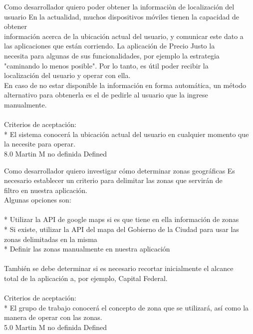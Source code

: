 \vspace{20pt}

	{Como desarrollador quiero poder obtener la informaciòn de localización del usuario} %
	{En la actualidad, muchos dispositivos móviles tienen la capacidad de obtener\\
información acerca de la ubicación actual del usuario, y comunicar este dato a\\
las aplicaciones que están corriendo. La aplicación de Precio Justo la\\
necesita para algunas de sus funcionalidades, por ejemplo la estrategia\\
"caminando lo menos posible". Por lo tanto, es útil poder recibir la\\
localización del usuario y operar con ella.\\
En caso de no estar disponible la información en forma automática, un método\\
alternativo para obtenerla es el de pedirle al usuario que la ingrese\\
manualmente.\\
  \\
Criterios de aceptación:\\
* El sistema conocerá la ubicación actual del usuario en cualquier momento que la necesite para operar.\\
} %
	{} %
	{8.0} %
	{Martin M} %
	{no definida} %
	{Defined} %


\vspace{20pt}

	{Como desarrollador quiero investigar cómo determinar zonas geográficas} %
	{Es necesario establecer un criterio para delimitar las zonas que servirán de\\
filtro en nuestra aplicación.\\
Algunas opciones son:\\
  \\
* Utilizar la API de google maps si es que tiene en ella información de zonas\\
* Si existe, utilizar la API del mapa del Gobierno de la Ciudad para usar las zonas delimitadas en la misma\\
* Definir las zonas manualmente en nuestra aplicación\\
  \\
También se debe determinar si es necesario recortar inicialmente el alcance\\
total de la aplicación a, por ejemplo, Capital Federal.\\
  \\
Criterios de aceptación:\\
* El grupo de trabajo conocerá el concepto de zona que se utilizará, así como la manera de operar con las zonas.  \\
} %
	{} %
	{5.0} %
	{Martin M} %
	{no definida} %
	{Defined} %


